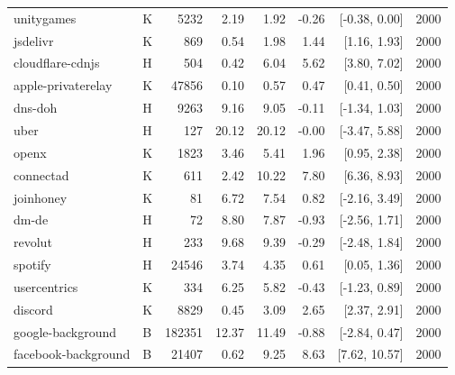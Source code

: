 \begin{longtable}{llrrrrrr}
unitygames & K & 5232 & 2.19 & 1.92 & -0.26 & [-0.38, 0.00] & 2000\\
jsdelivr & K & 869 & 0.54 & 1.98 & 1.44 & [1.16, 1.93] & 2000\\
cloudflare-cdnjs & H & 504 & 0.42 & 6.04 & 5.62 & [3.80, 7.02] & 2000\\
apple-privaterelay & K & 47856 & 0.10 & 0.57 & 0.47 & [0.41, 0.50] & 2000\\
dns-doh & H & 9263 & 9.16 & 9.05 & -0.11 & [-1.34, 1.03] & 2000\\
uber & H & 127 & 20.12 & 20.12 & -0.00 & [-3.47, 5.88] & 2000\\
openx & K & 1823 & 3.46 & 5.41 & 1.96 & [0.95, 2.38] & 2000\\
connectad & K & 611 & 2.42 & 10.22 & 7.80 & [6.36, 8.93] & 2000\\
joinhoney & K & 81 & 6.72 & 7.54 & 0.82 & [-2.16, 3.49] & 2000\\
dm-de & H & 72 & 8.80 & 7.87 & -0.93 & [-2.56, 1.71] & 2000\\
revolut & H & 233 & 9.68 & 9.39 & -0.29 & [-2.48, 1.84] & 2000\\
spotify & H & 24546 & 3.74 & 4.35 & 0.61 & [0.05, 1.36] & 2000\\
usercentrics & K & 334 & 6.25 & 5.82 & -0.43 & [-1.23, 0.89] & 2000\\
discord & K & 8829 & 0.45 & 3.09 & 2.65 & [2.37, 2.91] & 2000\\
google-background & B & 182351 & 12.37 & 11.49 & -0.88 & [-2.84, 0.47] & 2000\\
facebook-background & B & 21407 & 0.62 & 9.25 & 8.63 & [7.62, 10.57] & 2000\\
\end{longtable}\endgroup
